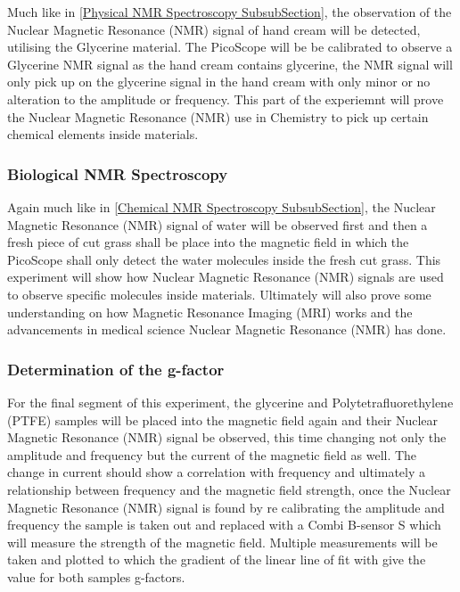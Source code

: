 \documentclass[12pt]{article}
\begin{document}
Much like in \cref{Physical NMR Spectroscopy SubsubSection}, the observation of the Nuclear Magnetic Resonance (NMR) signal of hand cream will be detected, utilising the Glycerine material. The PicoScope will be be calibrated to observe a Glycerine NMR signal as the hand cream contains glycerine, the NMR signal will only pick up on the glycerine signal in the hand cream with only minor or no alteration to the amplitude or frequency. This part of the experiemnt will prove the Nuclear Magnetic Resonance (NMR) use in Chemistry to pick up certain chemical elements inside materials.

\subsubsection{Biological NMR Spectroscopy}
\label{Biological NMR Spectroscopy SubsubSection}

Again much like in \cref{Chemical NMR Spectroscopy SubsubSection}, the Nuclear Magnetic Resonance (NMR) signal of water will be observed first and then a fresh piece of cut grass shall be place into the magnetic field in which the PicoScope shall only detect the water molecules inside the fresh cut grass. This experiment will show how Nuclear Magnetic Resonance (NMR) signals are used to observe specific molecules inside materials. Ultimately will also prove some understanding on how Magnetic Resonance Imaging (MRI) works and the advancements in medical science Nuclear Magnetic Resonance (NMR) has done. 

\subsubsection{Determination of the g-factor}
\label{Determination of the g-factor SubsubSection}

For the final segment of this experiment, the glycerine and Polytetrafluorethylene (PTFE) samples will be placed into the magnetic field again and their Nuclear Magnetic Resonance (NMR) signal be observed, this time changing not only the amplitude and frequency but the current of the magnetic field as well. The change in current should show a correlation with frequency and ultimately a relationship between frequency and the magnetic field strength, once the Nuclear Magnetic Resonance (NMR) signal is found by re calibrating the amplitude and frequency the sample is taken out and replaced with a Combi B-sensor S \cite{Exp.A-2020} which will measure the strength of the magnetic field. Multiple measurements will be taken and plotted to which the gradient of the linear line of fit with give the value for both samples g-factors.
\end{document}
